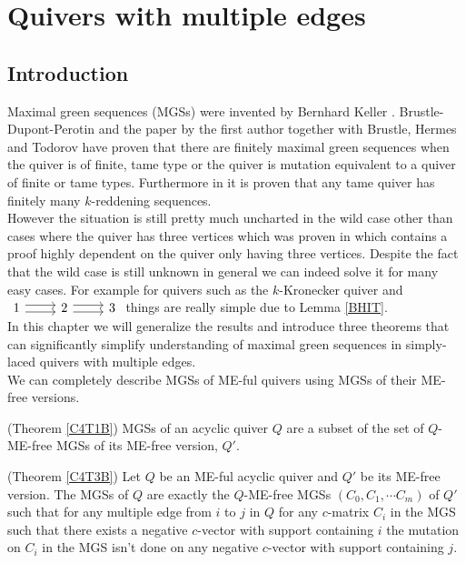 \chapter{Quivers with multiple edges}\label{C4}
\section{Introduction}
\indent Maximal green sequences (MGSs) were invented by Bernhard Keller \cite{Kel11}. Brustle-Dupont-Perotin \cite{BDP13} and the paper by the first author together with Brustle, Hermes and Todorov \cite{BHIT15} have proven that there are finitely maximal green sequences when the quiver is of finite, tame type or the quiver is mutation equivalent to a quiver of finite or tame types. Furthermore in \cite{BHIT15} it is proven that any tame quiver has finitely many $k$-reddening sequences.\\
\indent However the situation is still pretty much uncharted in the wild case other than cases where the quiver has three vertices which was proven in  \cite{BDP13} which contains a proof highly dependent on the quiver only having three vertices. Despite the fact that the wild case is still unknown in general we can indeed solve it for many easy cases. For example for quivers such as the $k$-Kronecker quiver and $\begin{tikzcd}1\arrow[r, shift right=0.6ex]\arrow[r, shift left=0.6ex] & 2\arrow[r, shift right=0.6ex]\arrow[r, shift left=0.6ex] & 3\end{tikzcd}$ things are really simple due to Lemma \ref{BHIT}.\\
\indent In this chapter we will generalize the results and introduce three theorems that can significantly simplify understanding of maximal green sequences in simply-laced quivers with multiple edges.\\
\indent We can completely describe MGSs of ME-ful quivers using MGSs of their ME-free versions.\\
\begin{theorem}
(Theorem \ref{C4T1B}) MGSs of an acyclic quiver $Q$ are a subset of the set of $Q$-ME-free MGSs of its ME-free version, $Q'$.\label{C4T1}
\end{theorem}
\begin{theorem}
(Theorem \ref{C4T3B}) Let $Q$ be an ME-ful acyclic quiver and $Q'$ be its ME-free version. The MGSs of $Q$ are exactly the $Q$-ME-free MGSs $(C_0,C_1,\cdots C_m)$ of $Q'$ such that for any multiple edge from $i$ to $j$ in $Q$ for any $c$-matrix $C_i$ in the MGS such that there exists a negative $c$-vector with support containing $i$ the mutation on $C_i$ in the MGS isn't done on any negative $c$-vector with support containing $j$.\label{C4T3}
\end{theorem}
